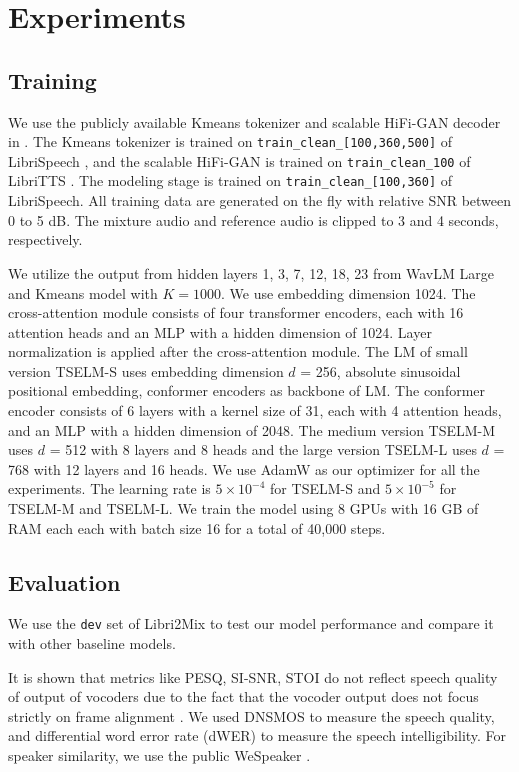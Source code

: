 \documentclass[conference]{IEEEtran}
\begin{document}
\section{Experiments}

\subsection{Training}

We use the publicly available Kmeans tokenizer and scalable 
HiFi-GAN decoder in \cite{speechbrain}. The Kmeans tokenizer
is trained on \texttt{train\_clean\_[100,360,500]} of
LibriSpeech \cite{librispeech}, and the scalable HiFi-GAN is trained on \texttt{train\_clean\_100} of 
LibriTTS \cite{libritts}. The modeling stage is trained on 
\texttt{train\_clean\_[100,360]} of LibriSpeech. All training data are 
generated on the fly with relative SNR between 0 to 5 dB. The mixture audio and reference audio is clipped to 3 and 4 seconds, respectively.

We utilize the output from hidden layers 1, 3, 7, 12, 18, 23 from WavLM Large and Kmeans model with 
\(K=1000\).
We use embedding dimension 1024.  The cross-attention module consists of four transformer encoders, each with 16 attention heads and an MLP with a hidden dimension of 1024. Layer normalization is applied after the cross-attention module.
The LM of small version TSELM-S uses 
embedding dimension \(d\) = 256, absolute sinusoidal positional embedding, conformer encoders as backbone of LM. The conformer encoder consists of 6 layers with a kernel size of 31, each with 4 attention heads, and an MLP with a hidden dimension of 2048. The medium version TSELM-M uses \(d\) = 512 with 8 layers and 8 heads and the large version TSELM-L uses 
\(d\) = 768 with 12 layers and 16 heads. We use AdamW as 
our optimizer for all the experiments. The learning rate 
is \(5 \times 10^{-4}\) for TSELM-S and \(5 \times 10^{-5}\) for TSELM-M and TSELM-L. We train the model using 8 GPUs with 16 GB of RAM each each with batch size 16 for a total of 40,000 steps.


\subsection{Evaluation}



We use the \texttt{dev} set of Libri2Mix \cite{librimix} to test our model performance and compare it with 
other baseline models. 

It is shown that metrics like PESQ, SI-SNR, STOI do not reflect speech quality of output of 
vocoders due to the fact that the vocoder output does not focus strictly on frame alignment
\cite{tokensplit,selm}. We used DNSMOS \cite{dnsmos} to measure the speech quality, and differential 
word error 
rate (dWER) \cite{dwer} to measure the speech intelligibility. For speaker similarity, we use the 
public WeSpeaker \cite{wespeaker}.
\end{document}
